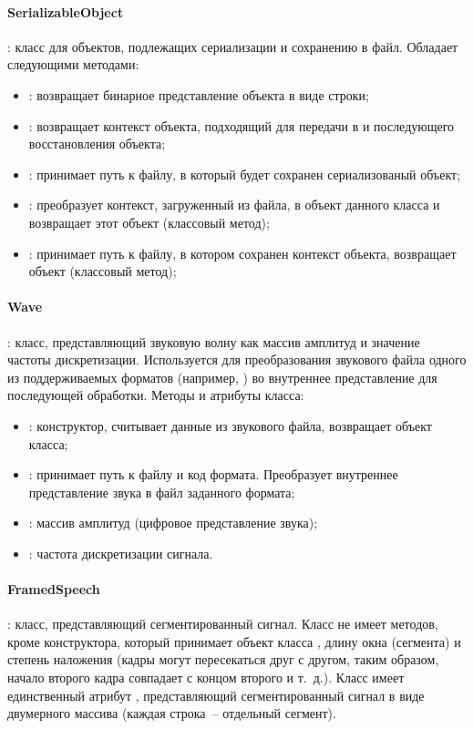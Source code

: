 \paragraph{SerializableObject}: класс для объектов, подлежащих сериализации и сохранению в файл. Обладает следующими методами:
\begin{itemize}
\item {}: возвращает бинарное представление объекта в виде строки;
\item {}: возвращает контекст объекта, подходящий для передачи в  и последующего восстановления объекта;
\item {}: принимает путь к файлу, в который будет сохранен сериализованый объект;
\item {}: преобразует контекст, загруженный из файла, в объект данного класса и возвращает этот объект (классовый метод);
\item {}: принимает путь к файлу, в котором сохранен контекст объекта, возвращает объект (классовый метод);
\end{itemize}

\paragraph{Wave}: класс, представляющий звуковую волну как массив амплитуд и значение частоты дискретизации. Используется для преобразования звукового файла одного из поддерживаемых форматов (например, ) во внутреннее представление для последующей обработки. Методы и атрибуты класса:
\begin{itemize}
\item {}: конструктор, считывает данные из звукового файла, возвращает объект класса;
\item {}: принимает путь к файлу и код формата. Преобразует внутреннее представление звука в файл заданного формата;
\item {}: массив амплитуд (цифровое представление звука);
\item {}: частота дискретизации сигнала.
\end{itemize}

\paragraph{FramedSpeech}: класс, представляющий сегментированный сигнал. Класс не имеет методов, кроме конструктора, который принимает объект класса , длину окна (сегмента) и степень наложения (кадры могут пересекаться друг с другом, таким образом, начало второго кадра совпадает с концом второго и т.~д.). Класс имеет единственный атрибут , представляющий сегментированный сигнал в виде двумерного массива (каждая строка~-- отдельный сегмент).

